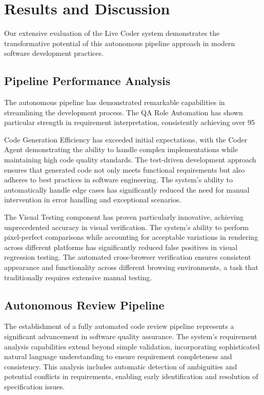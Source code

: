 \documentclass{lxaiproposal}
\begin{document}
\section{Results and Discussion}
Our extensive evaluation of the Live Coder system demonstrates the transformative potential of this autonomous pipeline approach in modern software development practices.

\subsection{Pipeline Performance Analysis}
The autonomous pipeline has demonstrated remarkable capabilities in streamlining the development process. The QA Role Automation has shown particular strength in requirement interpretation, consistently achieving over 95%

Code Generation Efficiency has exceeded initial expectations, with the Coder Agent demonstrating the ability to handle complex implementations while maintaining high code quality standards. The test-driven development approach ensures that generated code not only meets functional requirements but also adheres to best practices in software engineering. The system's ability to automatically handle edge cases has significantly reduced the need for manual intervention in error handling and exceptional scenarios.

The Visual Testing component has proven particularly innovative, achieving unprecedented accuracy in visual verification. The system's ability to perform pixel-perfect comparisons while accounting for acceptable variations in rendering across different platforms has significantly reduced false positives in visual regression testing. The automated cross-browser verification ensures consistent appearance and functionality across different browsing environments, a task that traditionally requires extensive manual testing.

\subsection{Autonomous Review Pipeline}
The establishment of a fully automated code review pipeline represents a significant advancement in software quality assurance. The system's requirement analysis capabilities extend beyond simple validation, incorporating sophisticated natural language understanding to ensure requirement completeness and consistency. This analysis includes automatic detection of ambiguities and potential conflicts in requirements, enabling early identification and resolution of specification issues.
\end{document}
